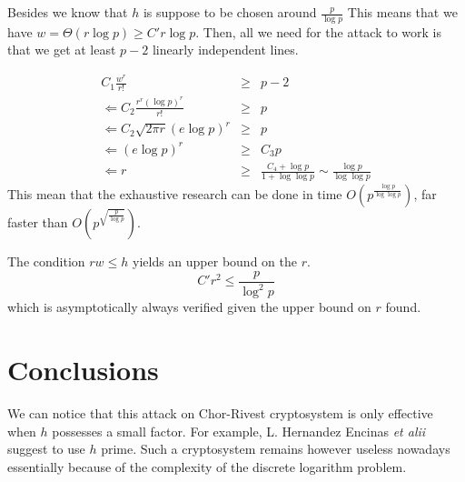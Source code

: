 \documentclass[12pt,a4paper,titlepage]{article}
\begin{document}
Besides we know that $h$ is suppose to be chosen around $\frac{p}{\log p}$ This means that we have $w = \Theta(r \log p) \geq C' r \log p$.
Then, all we need for the attack to work is that we get at least $p-2$ linearly independent lines.


\begin{eqnarray*}
C_1 \frac{w^r}{r!} &\geq& p-2 \\
\Leftarrow C_2  \frac{r^r (\log p)^r}{r!} &\geq& p \\
\Leftarrow C_2 \sqrt{2\pi r} (e \log p)^r &\geq& p  \\
\Leftarrow (e \log p)^r &\geq& C_3 p \\
\Leftarrow r &\geq& \frac{C_4 + \log p}{1 + \log \log p} \sim \frac{\log p}{\log \log p}
\end{eqnarray*}
This mean that the exhaustive research can be done in time $O\left( p^{\frac{\log p}{\log \log p}} \right)$, far faster than $O\left(p^{\sqrt{\frac{p}{\log p}}}\right)$.

The condition $r w \leq h$ yields an upper bound on the $r$.
$$ C' r^2 \leq \frac{p}{\log^2 p}  $$
which is asymptotically always verified given the upper bound on $r$ found.



\section{Conclusions}

We can notice that this attack on Chor-Rivest cryptosystem is only effective when $h$ possesses a small factor. For example, L. Hernandez Encinas \textit{et alii} \cite{Enc04} suggest to use $h$ prime. Such a cryptosystem remains however useless nowadays essentially because of the complexity of the discrete logarithm problem.







\newpage
\appendix
\end{document}
